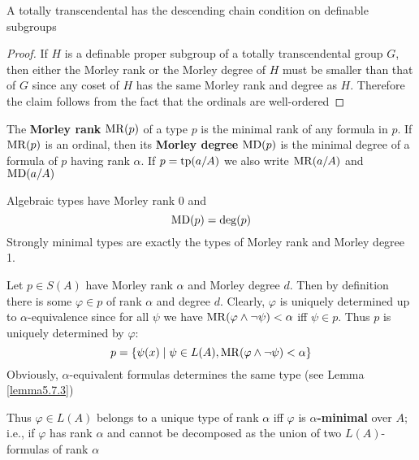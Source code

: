 \documentclass[11pt]{article}
\begin{document}
\begin{remark}
A totally transcendental has the descending chain condition on definable subgroups
\end{remark}

\begin{proof}
If \(H\) is a definable proper subgroup of a totally transcendental group \(G\), then either the
Morley rank or the Morley degree of \(H\) must be smaller than that of \(G\) since any coset
of \(H\) has the same Morley rank and degree as \(H\). Therefore the claim follows from the fact
that the ordinals are well-ordered
\end{proof}

\begin{definition}[]
The \textbf{Morley rank} \(\operatorname{MR}(p)\) of a type \(p\) is the minimal rank of any formula in \(p\).
If \(\operatorname{MR}(p)\) is an ordinal, then its \textbf{Morley degree} \(\operatorname{MD}(p)\) is the minimal degree of a
formula of \(p\) having rank \(\alpha\). If \(p=\operatorname{tp}(a/A)\) we also write \(\operatorname{MR}(a/A)\) and \(\operatorname{MD}(a/A)\)
\end{definition}

Algebraic types have Morley rank 0 and
\begin{equation*}
\operatorname{MD}(p)=\deg(p)
\end{equation*}
Strongly minimal types are exactly the types of Morley rank and Morley degree 1.

Let \(p\in S(A)\) have Morley rank \(\alpha\) and Morley degree \(d\). Then by definition there is
some \(\varphi\in p\) of rank \(\alpha\) and degree \(d\). Clearly, \(\varphi\) is uniquely determined up to \(\alpha\)-equivalence
since for all \(\psi\) we have \(\operatorname{MR}(\varphi\wedge\neg\psi)<\alpha\) iff \(\psi\in p\). Thus \(p\) is uniquely determined by \(\varphi\):
\begin{equation}
p=\{\psi(x)\mid \psi\in L(A),\operatorname{MR}(\varphi\wedge\neg\psi)<\alpha\}\label{6.2}
\end{equation}
Obviously, \(\alpha\)-equivalent formulas determines the same type (see Lemma \ref{lemma5.7.3})
\label{Problem10}

Thus \(\varphi\in L(A)\) belongs to a unique type of rank \(\alpha\) iff \(\varphi\) is \textbf{\(\alpha\)-minimal} over \(A\); i.e., if
\(\varphi\) has rank \(\alpha\) and cannot be decomposed as the union of two \(L(A)\)-formulas of rank \(\alpha\)
\end{document}
